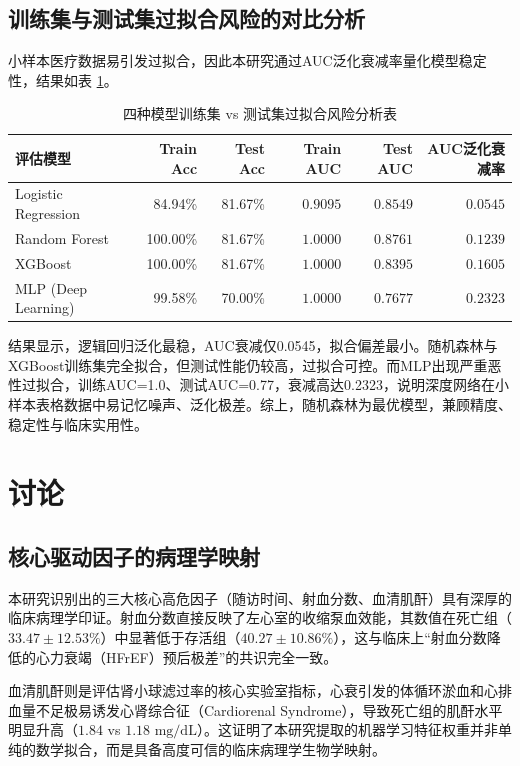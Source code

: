 \documentclass[11pt,a4paper]{ctexart} %
\begin{document}
\subsection{训练集与测试集过拟合风险的对比分析}
小样本医疗数据易引发过拟合，因此本研究通过AUC泛化衰减率量化模型稳定性，结果如表 \ref{tab:overfitting}。

\begin{table}[H]
\centering
\caption{四种模型训练集 vs 测试集过拟合风险分析表}
\label{tab:overfitting}
\small
\begin{tabular}{lrrrrr}
\toprule
\textbf{评估模型} & \textbf{Train Acc} & \textbf{Test Acc} & \textbf{Train AUC} & \textbf{Test AUC} & \textbf{AUC泛化衰减率 } \\
\midrule
Logistic Regression & \num{84.94}\% & \num{81.67}\% & $0.9095$ & $0.8549$ & $0.0545$ \\
Random Forest & \num{100.00}\% & \num{81.67}\% & $1.0000$ & $0.8761$ & $0.1239$ \\
XGBoost & \num{100.00}\% & \num{81.67}\% & $1.0000$ & $0.8395$ & $0.1605$ \\
MLP (Deep Learning) & \num{99.58}\% & \num{70.00}\% & $1.0000$ & $0.7677$ & $0.2323$ \\
\bottomrule
\end{tabular}
\end{table}

结果显示，逻辑回归泛化最稳，AUC衰减仅0.0545，拟合偏差最小。随机森林与XGBoost训练集完全拟合，但测试性能仍较高，过拟合可控。而MLP出现严重恶性过拟合，训练AUC=1.0、测试AUC=0.77，衰减高达0.2323，说明深度网络在小样本表格数据中易记忆噪声、泛化极差。综上，随机森林为最优模型，兼顾精度、稳定性与临床实用性。

\section{讨论}

\subsection{核心驱动因子的病理学映射}
本研究识别出的三大核心高危因子（随访时间、射血分数、血清肌酐）具有深厚的临床病理学印证。射血分数直接反映了左心室的收缩泵血效能，其数值在死亡组（$33.47 \pm 12.53\%$）中显著低于存活组（$40.27 \pm 10.86\%$），这与临床上“射血分数降低的心力衰竭（HFrEF）预后极差”的共识完全一致\cite{ponikowski2014heart}。

血清肌酐则是评估肾小球滤过率的核心实验室指标，心衰引发的体循环淤血和心排血量不足极易诱发心肾综合征（Cardiorenal Syndrome），导致死亡组的肌酐水平明显升高（$1.84$ vs $1.18\text{ mg/dL}$）\cite{ahmad2022survival}。这证明了本研究提取的机器学习特征权重并非单纯的数学拟合，而是具备高度可信的临床病理学生物学映射。
\end{document}

